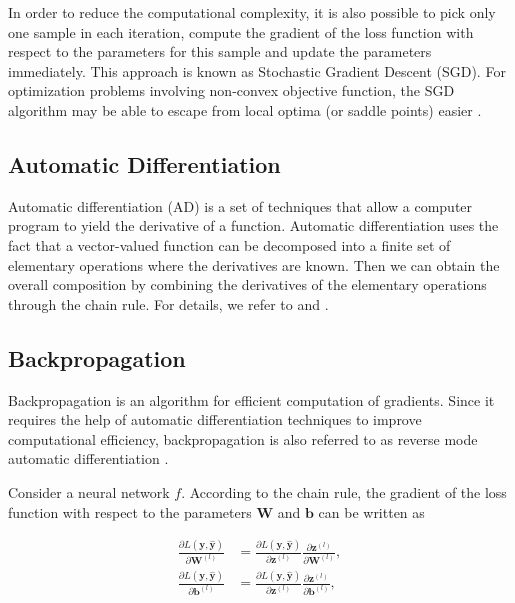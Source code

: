 \documentclass[
	parskip, 			   %
	twoside, 			   %
	DIV=14, 			   %
	BCOR=15.0mm, 		   %
	headsepline, 		   %
	open=right, 		   %
	captions=tableheading, %
	bibliography=totoc,    %
	numbers=noenddot       %
]{scrreprt}
\begin{document}
In order to reduce the computational complexity, it is also possible to pick only one sample in each iteration, compute the gradient of the loss function with respect to the parameters for this sample and update the parameters immediately. This approach is known as Stochastic Gradient Descent (SGD). For optimization problems involving non-convex objective function, the SGD algorithm may be able to escape from local optima (or saddle points) easier \cite{sun2019survey}.

\subsection{Automatic Differentiation}
Automatic differentiation (AD) is a set of techniques that allow a computer program to yield the derivative of a function. Automatic differentiation uses the fact that a vector-valued function can be decomposed into a finite set of elementary operations where the derivatives are known. Then we can obtain the overall composition by combining the derivatives of the elementary operations through the chain rule. For details, we refer to \cite{baydin2018automatic} and \cite{margossian2019review}.

\subsection{Backpropagation}
Backpropagation is an algorithm for efficient computation of gradients. Since it requires the help of automatic differentiation techniques to improve computational efficiency, backpropagation is also referred to as reverse mode automatic differentiation \cite{baydin2018automatic}.

Consider a neural network $f$. According to the chain rule, the gradient of the loss function with respect to the parameters $\mathbf{W}$ and $\mathbf{b}$ can be written as

\begin{equation}
    \label{eq:Chain_rule_partial}
    \begin{aligned}
        \frac{\partial L\left( \mathbf{y}, \hat{\mathbf{y}} \right)}{\partial \mathbf{W}^{(l)}} &= \frac{\partial L \left( \mathbf{y}, \hat{\mathbf{y}} \right)}{\partial \mathbf{z}^{(l)}} 
        \frac{\partial \mathbf{z}^{(l)}}{\partial \mathbf{W}^{(l)}},
        \\
        \frac{\partial L\left( \mathbf{y}, \hat{\mathbf{y}} \right)}{\partial \mathbf{b}^{(l)}} &= \frac{\partial L \left( \mathbf{y}, \hat{\mathbf{y}} \right)}{\partial \mathbf{z}^{(l)}} 
        \frac{\partial \mathbf{z}^{(l)}}{\partial \mathbf{b}^{(l)}},
    \end{aligned}
\end{equation}
\end{document}
